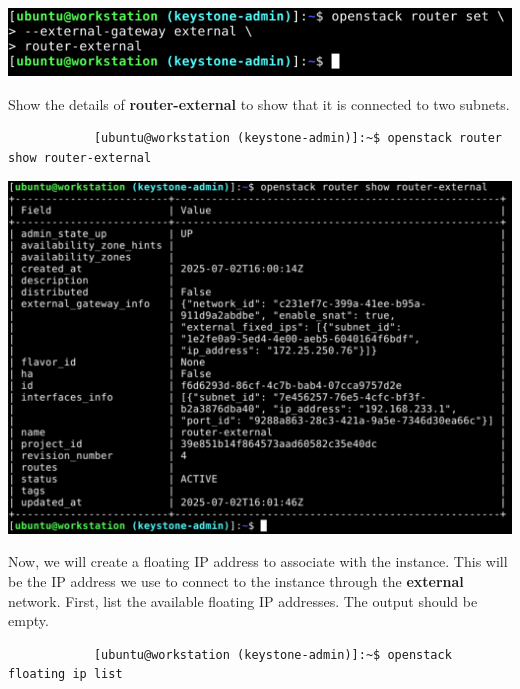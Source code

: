 \documentclass[letterpaper, 12pt]{article}
\begin{document}
\begin{enumerate}
\begin{labstep}
        \begin{center}
            \includegraphics[width=\linewidth]{images/part9/step17.png}
        \end{center}
    \end{labstep}

    \begin{labstep}
        Show the details of \textbf{router-external} to show that it is connected to two subnets.
        \begin{lstlisting}
            [ubuntu@workstation (keystone-admin)]:~$ openstack router show router-external
        \end{lstlisting}

        \begin{center}
            \includegraphics[width=\linewidth]{images/part9/step18.png}
        \end{center}
    \end{labstep}

    \begin{labstep}
        Now, we will create a floating IP address to associate with the instance.
        This will be the IP address we use to connect to the instance through the \textbf{external} network.
        First, list the available floating IP addresses.
        The output should be empty.
        \begin{lstlisting}
            [ubuntu@workstation (keystone-admin)]:~$ openstack floating ip list
        \end{lstlisting}


\end{labstep}
\end{enumerate}
\end{document}
